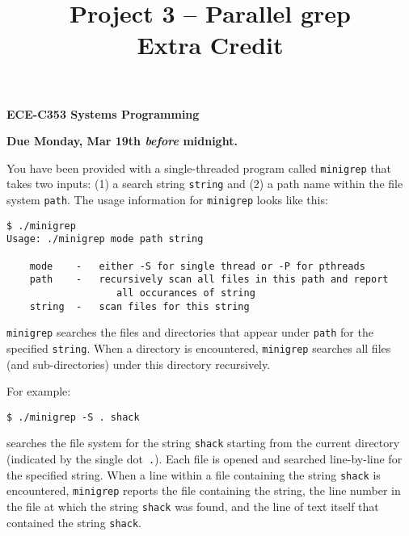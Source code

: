 \documentclass[10pt]{article}
\title{Project 3 -- Parallel grep \\ Extra Credit}
\makeatletter
\def\maketitle{\begin{center}{\bfseries \Large ECE-C353 Systems Programming \\ \@title} \end{center}\vspace{10pt}}
\makeatother
\begin{document}
\maketitle %
\date{}

\begin{center}
\vspace{12pt}
\textbf{Due Monday, Mar 19th \emph{before} midnight.}
\end{center}

\vspace{6pt}

\noindent You have been provided with a single-threaded program called
\texttt{minigrep} that takes two inputs: (1) a search string \texttt{string}
and (2) a path name within the file system \texttt{path}.  The usage
information for \texttt{minigrep} looks like this:

\vspace{6pt}

\begin{verbatim}
$ ./minigrep
Usage: ./minigrep mode path string

    mode    -   either -S for single thread or -P for pthreads
    path    -   recursively scan all files in this path and report
                   all occurances of string
    string  -   scan files for this string
\end{verbatim}

\vspace{6pt}

\texttt{minigrep} searches the files and directories that appear under
\texttt{path} for the specified \texttt{string}. When a directory is encountered,
\texttt{minigrep} searches all files (and sub-directories) under this
directory recursively.

For example:

\vspace{6pt}

\begin{verbatim}
$ ./minigrep -S . shack
\end{verbatim}

\noindent searches the file system for the string \texttt{shack}
starting from the current directory (indicated by the single
dot~\texttt{.}).  Each file is opened and searched line-by-line for the
specified string.  When a line within a file containing the string
\texttt{shack} is encountered, \texttt{minigrep} reports the file
containing the string, the line number in the file at which the string
\texttt{shack} was found, and the line of text itself that contained the
string \texttt{shack}.
\end{document}
